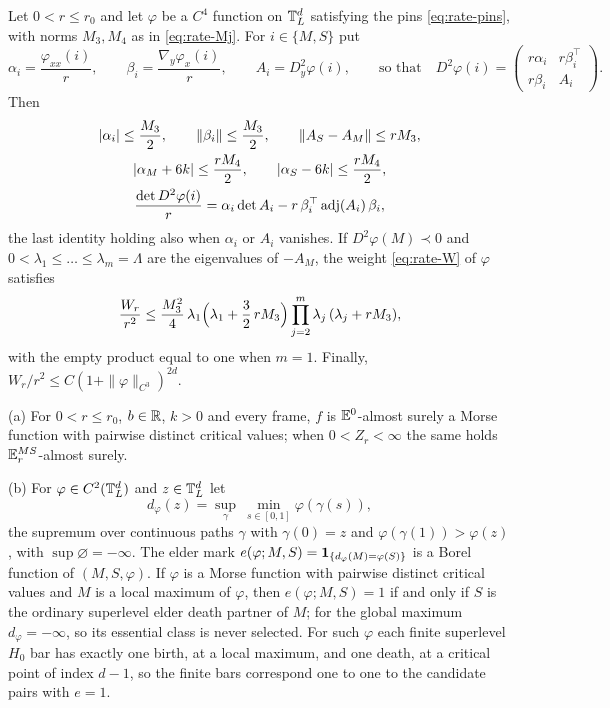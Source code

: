 \begin{lemma}\label{lem:rate-endpoint}
Let $0<r\le r_0$ and let $\varphi$ be a $C^4$ function on $\mathbb T^d_L$ satisfying the pins \eqref{eq:rate-pins}, with norms $M_3,M_4$ as in \eqref{eq:rate-Mj}. For $i\in\{M,S\}$ put
\[
\alpha_i=\frac{\varphi_{xx}(i)}r,\qquad \beta_i=\frac{\nabla_y\varphi_x(i)}r,\qquad A_i=D_y^2\varphi(i),\qquad\text{so that}\quad D^2\varphi(i)=\begin{pmatrix}r\alpha_i&r\beta_i^{\top}\\ r\beta_i&A_i\end{pmatrix}.
\]
Then
\begin{gather}
|\alpha_i|\le\frac{M_3}2,\qquad \|\beta_i\|\le\frac{M_3}2,\qquad \|A_S-A_M\|\le rM_3,\label{eq:rate-51}\\
|\alpha_M+6k|\le\frac{rM_4}2,\qquad |\alpha_S-6k|\le\frac{rM_4}2,\label{eq:rate-52}\\
\frac{\det D^2\varphi(i)}r=\alpha_i\det A_i-r\,\beta_i^{\top}\operatorname{adj}(A_i)\,\beta_i,\label{eq:rate-53}
\end{gather}
the last identity holding also when $\alpha_i$ or $A_i$ vanishes. If $D^2\varphi(M)\prec0$ and $0<\lambda_1\le\dots\le\lambda_m=\Lambda$ are the eigenvalues of $-A_M$, the weight \eqref{eq:rate-W} of $\varphi$ satisfies
\begin{equation}\label{eq:rate-envelope}
\frac{W_r}{r^2}\le\frac{M_3^2}4\,\lambda_1\Bigl(\lambda_1+\frac32\,rM_3\Bigr)\prod_{j=2}^m\lambda_j\,(\lambda_j+rM_3),
\end{equation}
with the empty product equal to one when $m=1$. Finally, $W_r/r^2\le C(1+\|\varphi\|_{C^3})^{2d}$.
\end{lemma}

\begin{hypothesis}\label{hyp:rate-generic}
\textup{(a)} For $0<r\le r_0$, $b\in\mathbb R$, $k>0$ and every frame, $f$ is $\mathbb E^0$-almost surely a Morse function with pairwise distinct critical values; when $0<Z_r<\infty$ the same holds $\mathbb E^{MS}_r$-almost surely.

\textup{(b)} For $\varphi\in C^2(\mathbb T^d_L)$ and $z\in\mathbb T^d_L$ let
\[
d_\varphi(z)=\sup_\gamma\ \min_{s\in[0,1]}\varphi(\gamma(s)),
\]
the supremum over continuous paths $\gamma$ with $\gamma(0)=z$ and $\varphi(\gamma(1))>\varphi(z)$, with $\sup\varnothing=-\infty$. The elder mark $e(\varphi;M,S)=\mathbf 1_{\{d_\varphi(M)=\varphi(S)\}}$ is a Borel function of $(M,S,\varphi)$. If $\varphi$ is a Morse function with pairwise distinct critical values and $M$ is a local maximum of $\varphi$, then $e(\varphi;M,S)=1$ if and only if $S$ is the ordinary superlevel elder death partner of $M$; for the global maximum $d_\varphi=-\infty$, so its essential class is never selected. For such $\varphi$ each finite superlevel $H_0$ bar has exactly one birth, at a local maximum, and one death, at a critical point of index $d-1$, so the finite bars correspond one to one to the candidate pairs with $e=1$.
\end{hypothesis}

